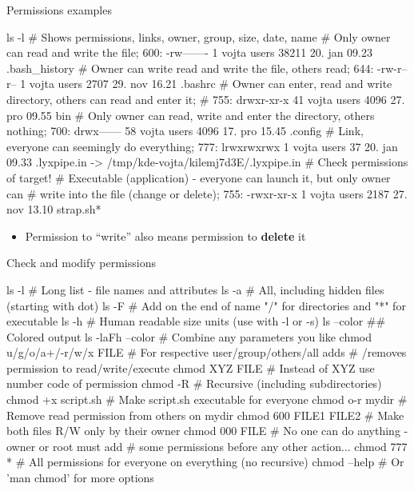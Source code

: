 \documentclass[compress, xelatex, 11pt, xcolor=svgnames, aspectratio=169, url={hyphens, lowtilde}]{beamer}
\begin{document}
\begin{frame}[fragile]{Permissions examples}
	\begin{bashcode}
    ls -l # Shows permissions, links, owner, group, size, date, name
    # Only owner can read and write the file; 600:
    -rw-------   1 vojta users   38211 20. jan 09.23 .bash_history
    # Owner can write read and write the file, others read; 644:
    -rw-r--r--   1 vojta users    2707 29. nov 16.21 .bashrc
    # Owner can enter, read and write directory, others can read and enter it;
    # 755:
    drwxr-xr-x  41 vojta users    4096 27. pro 09.55 bin
    # Only owner can read, write and enter the directory, others nothing; 700:
    drwx------  58 vojta users    4096 17. pro 15.45 .config
    # Link, everyone can seemingly do everything; 777:
    lrwxrwxrwx   1 vojta users      37 20. jan 09.33 .lyxpipe.in ->
      /tmp/kde-vojta/kilemj7d3E/.lyxpipe.in # Check permissions of target!
    # Executable (application) - everyone can launch it, but only owner can
    # write into the file (change or delete); 755:
    -rwxr-xr-x   1 vojta users    2187 27. nov 13.10 strap.sh*
	\end{bashcode}
	\vfill
	\begin{itemize}
		\item Permission to \enquote{write} also means permission to \textbf{delete} it
	\end{itemize}
\end{frame}

\begin{frame}[fragile]{Check and modify permissions}
	\begin{bashcode}
    ls -l # Long list - file names and attributes
    ls -a # All, including hidden files (starting with dot)
    ls -F # Add on the end of name "/" for directories and "*" for executable
    ls -h # Human readable size units (use with -l or -s)
    ls --color ## Colored output
    ls -laFh --color # Combine any parameters you like
    chmod u/g/o/a+/-r/w/x FILE # For respective user/group/others/all adds
                               # /removes permission to read/write/execute
    chmod XYZ FILE # Instead of XYZ use number code of permission
    chmod -R # Recursive (including subdirectories)
    chmod +x script.sh # Make script.sh executable for everyone
    chmod o-r mydir # Remove read permission from others on mydir
    chmod 600 FILE1 FILE2 # Make both files R/W only by their owner
    chmod 000 FILE # No one can do anything - owner or root must add
                   # some permissions before any other action...
    chmod 777 * # All permissions for everyone on everything (no recursive)
    chmod --help # Or 'man chmod' for more options
	\end{bashcode}
\end{frame}
\end{document}
